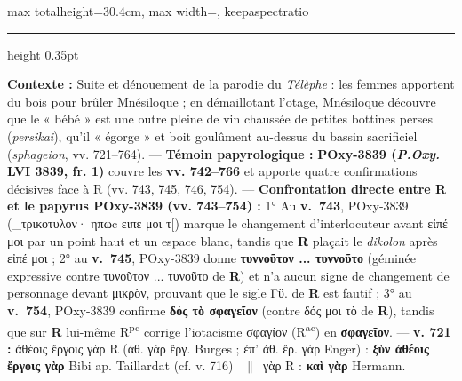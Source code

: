 \documentclass[11pt,twoside]{book}
\newcommand{\italique}[1]{\textit{#1}}
\newcommand{\expo}[1]{\textsuperscript{#1}}
\newcommand{\R}{\textbf{R}}
\newcommand{\Rpc}{R\expo{pc}}
\newcommand{\Rac}{R\expo{ac}}
\newcommand{\PsiDeux}{POxy-3839}
\newcommand{\lecon}[1]{\textbf{#1}}
\newcommand{\espApp}{\ {\color{ruleGold}$\parallel$}\ }
\begin{document}
\begin{adjustbox}{max totalheight=30.4cm, max width=\textwidth, keepaspectratio}
\begin{minipage}{\textwidth}
{{\color{ruleGold}\hrule height 0.35pt}\vspace{2.0pt}
 \textbf{Contexte :} Suite et dénouement de la parodie du \italique{Télèphe} : les femmes apportent du bois pour brûler Mnésiloque ; en démaillotant l'otage, Mnésiloque découvre que le « bébé » est une outre pleine de vin chaussée de petites bottines perses (\italique{persikai}), qu'il « égorge » et boit goulûment au-dessus du bassin sacrificiel (\italique{sphageion}, vv. 721–764). --- \textbf{Témoin papyrologique :} \textbf{\PsiDeux{} (\italique{P.Oxy.} LVI 3839, fr. 1)} couvre les \textbf{vv. 742–766} et apporte quatre confirmations décisives face à R (vv. 743, 745, 746, 754). --- \textbf{Confrontation directe entre R et le papyrus \PsiDeux{} (vv. 743–754) :} 1° Au \textbf{v.~743}, \PsiDeux{} (\_τρικοτυλον· ηπωc ειπε μοι τ[) marque le changement d'interlocuteur avant εἰπέ μοι par un point haut et un espace blanc, tandis que \R{} plaçait le \italique{dikolon} après εἰπέ μοι ; 2° au \textbf{v.~745}, \PsiDeux{} donne \lecon{τυννοῦτον ... τυννοῦτο} (géminée expressive contre τυνοῦτον ... τυνοῦτο de \R{}) et n'a aucun signe de changement de personnage devant μικρὸν, prouvant que le sigle Γϋ. de \R{} est fautif ; 3° au \textbf{v.~754}, \PsiDeux{} confirme \lecon{δός τὸ σφαγεῖον} (contre δός μοι τὸ de \R{}), tandis que sur \R{} lui-même \Rpc{} corrige l'iotacisme σφαγίον (\Rac{}) en \lecon{σφαγεῖον}. --- \textbf{v. 721 :} ἀθέοις ἔργοις γὰρ R (ἀθ. γὰρ ἔργ. Burges ; ἐπ' ἀθ. ἔρ. γὰρ Enger) : \lecon{ξὺν ἀθέοις ἔργοις γὰρ} Bibi ap. Taillardat (cf. v. 716) \espApp γὰρ R : \lecon{καὶ γὰρ} Hermann.\par}
\end{minipage}\end{adjustbox}
\newpage
\end{document}

